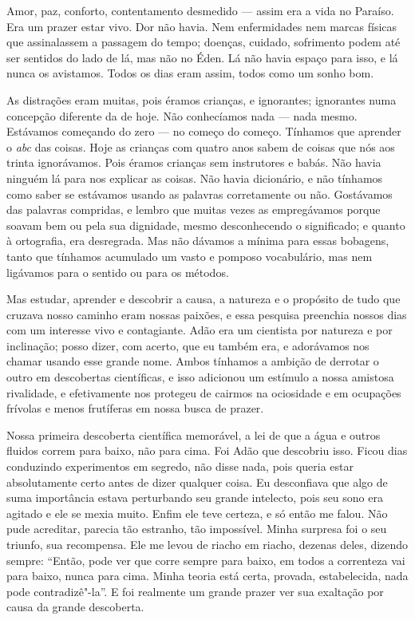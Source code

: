 Amor, paz, conforto, contentamento desmedido --- assim era a vida no Paraíso. Era
um prazer estar vivo. Dor não havia. Nem enfermidades nem marcas físicas que
assinalassem a passagem do tempo; doenças, cuidado, sofrimento podem até ser     
sentidos do lado de lá, mas não no Éden. Lá não havia espaço para isso, e lá
nunca os avistamos. Todos os dias eram assim, todos como um sonho bom.

As distrações eram muitas, pois éramos crianças, e ignorantes; ignorantes numa
concepção diferente da de hoje. Não conhecíamos nada --- nada mesmo. Estávamos
começando do zero --- no começo do começo. Tínhamos que aprender o
\textit{abc} das coisas. Hoje as crianças com quatro anos
sabem de coisas que nós aos trinta ignorávamos. Pois éramos crianças sem
instrutores e babás. Não havia ninguém lá para nos explicar as coisas. Não havia
dicionário, e não tínhamos como saber se estávamos usando as palavras corretamente
ou não. Gostávamos das palavras compridas, e lembro que muitas vezes as
empregávamos porque soavam bem ou pela sua dignidade, mesmo desconhecendo o
significado; e quanto à ortografia, era desregrada. Mas não dávamos a mínima para
essas bobagens, tanto que tínhamos acumulado um vasto e pomposo vocabulário, mas
nem ligávamos para o sentido ou para os métodos.

Mas estudar, aprender e descobrir a causa, a natureza e o propósito de tudo que
cruzava nosso caminho eram nossas paixões, e essa pesquisa preenchia nossos dias
com um interesse vivo e contagiante. Adão era um cientista por natureza e por
inclinação; posso dizer, com acerto, que eu também era, e adorávamos nos chamar
usando esse grande nome. Ambos tínhamos a ambição de derrotar o outro em
descobertas científicas, e isso adicionou um estímulo a nossa amistosa
rivalidade, e efetivamente nos protegeu de cairmos na ociosidade e em ocupações frívolas
e menos frutíferas em nossa busca de prazer.

Nossa primeira descoberta científica memorável, a lei de que a água e outros
fluidos correm para baixo, não para cima. Foi Adão que descobriu isso. Ficou
dias conduzindo experimentos em segredo, não disse nada, pois
queria estar absolutamente certo antes de dizer qualquer coisa. Eu desconfiava que
algo de suma importância estava perturbando seu grande intelecto, pois seu
sono era agitado e ele se mexia muito. Enfim ele teve certeza,
e só então me falou. Não pude acreditar, parecia tão estranho, tão
impossível. Minha surpresa foi o seu triunfo, sua recompensa. Ele me levou de
riacho em riacho, dezenas deles, dizendo sempre: “Então, pode ver que corre sempre
para baixo, em todos a correnteza vai para baixo, nunca para cima. Minha
teoria está certa, provada, estabelecida, nada pode contradizê"-la”. E foi
realmente um grande prazer ver sua exaltação por causa da grande descoberta.

